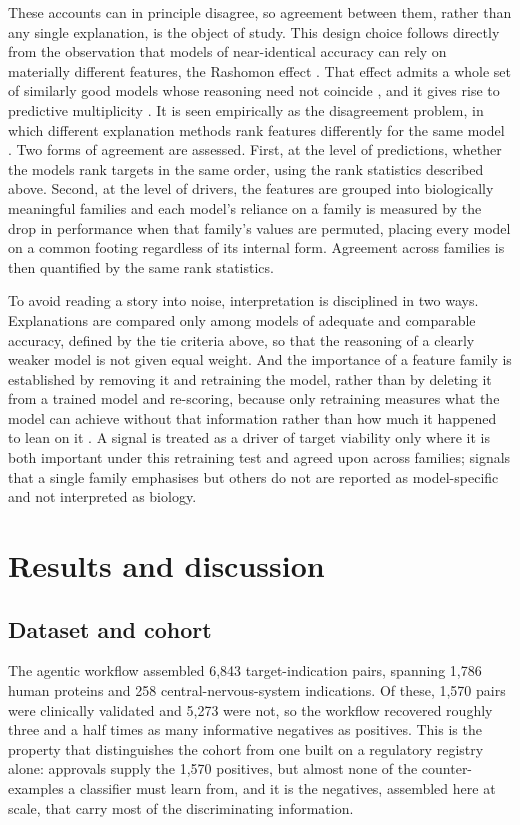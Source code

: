\documentclass[11pt,twocolumn]{article}
\begin{document}
These accounts can in principle disagree, so agreement between them, rather than any single explanation, is the object of study. This design choice follows directly from the observation that models of near-identical accuracy can rely on materially different features, the Rashomon effect \cite{ref63}. That effect admits a whole set of similarly good models whose reasoning need not coincide \cite{ref64,ref65}, and it gives rise to predictive multiplicity \cite{ref66}. It is seen empirically as the disagreement problem, in which different explanation methods rank features differently for the same model \cite{ref67}. Two forms of agreement are assessed. First, at the level of predictions, whether the models rank targets in the same order, using the rank statistics described above. Second, at the level of drivers, the features are grouped into biologically meaningful families and each model's reliance on a family is measured by the drop in performance when that family's values are permuted, placing every model on a common footing regardless of its internal form. Agreement across families is then quantified by the same rank statistics.

To avoid reading a story into noise, interpretation is disciplined in two ways. Explanations are compared only among models of adequate and comparable accuracy, defined by the tie criteria above, so that the reasoning of a clearly weaker model is not given equal weight. And the importance of a feature family is established by removing it and retraining the model, rather than by deleting it from a trained model and re-scoring, because only retraining measures what the model can achieve without that information rather than how much it happened to lean on it \cite{ref68}. A signal is treated as a driver of target viability only where it is both important under this retraining test and agreed upon across families; signals that a single family emphasises but others do not are reported as model-specific and not interpreted as biology.

\section{Results and discussion}

\subsection{Dataset and cohort}

The agentic workflow assembled 6,843 target-indication pairs, spanning 1,786 human proteins and 258 central-nervous-system indications. Of these, 1,570 pairs were clinically validated and 5,273 were not, so the workflow recovered roughly three and a half times as many informative negatives as positives. This is the property that distinguishes the cohort from one built on a regulatory registry alone: approvals supply the 1,570 positives, but almost none of the counter-examples a classifier must learn from, and it is the negatives, assembled here at scale, that carry most of the discriminating information.
\end{document}
